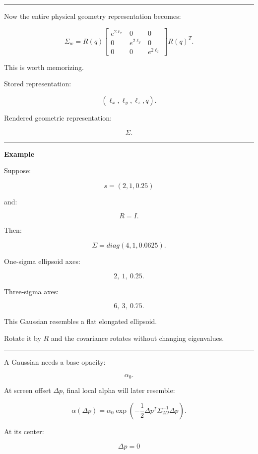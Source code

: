 \begin{center}\rule{0.5\linewidth}{0.5pt}\end{center}

Now the entire physical geometry representation becomes:

\[
\boxed{
\Sigma_w
=
R(q)
\begin{bmatrix}
e^{2\ell_x}&0&0\\
0&e^{2\ell_y}&0\\
0&0&e^{2\ell_z}
\end{bmatrix}
R(q)^T.
}
\]

This is worth memorizing.

Stored representation:

\[
(\ell_x,\ell_y,\ell_z,q).
\]

Rendered geometric representation:

\[
\Sigma.
\]

\begin{center}\rule{0.5\linewidth}{0.5pt}\end{center}

\textbf{Example}

Suppose:

\[
s=(2,1,0.25)
\]

and:

\[
R=I.
\]

Then:

\[
\Sigma=
diag(
4,
1,
0.0625
).
\]

One-sigma ellipsoid axes:

\[
2,\ 1,\ 0.25.
\]

Three-sigma axes:

\[
6,\ 3,\ 0.75.
\]

This Gaussian resembles a flat elongated ellipsoid.

Rotate it by \(R\) and the covariance rotates without changing eigenvalues.

\begin{center}\rule{0.5\linewidth}{0.5pt}\end{center}

A Gaussian needs a base opacity:

\[
\alpha_0.
\]

At screen offset \(\Delta p\), final local alpha will later resemble:

\[
\alpha(\Delta p)
=
\alpha_0
\exp
\left(
-\frac12
\Delta p^T
\Sigma_{2D}^{-1}
\Delta p
\right).
\]

At its center:

\[
\Delta p=0
\]

